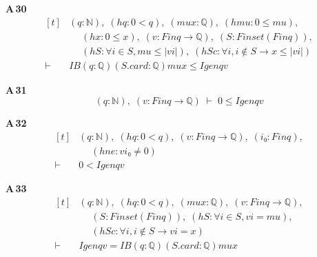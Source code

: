 \noindent\textbf{A\,30}\quad{}
{\footnotesize\[ \begin{aligned}[t]
&(\mathit{q} : \mathbb{N} ),\; (\mathit{hq} : 0 < \mathit{q}),\; (\mathit{mu} \mathit{x} : \mathbb{Q} ),\; (\mathit{hmu} : 0 \leq \mathit{mu}),\\
&\quad \; (\mathit{hx} : 0 \leq \mathit{x}),\; (\mathit{v} : \mathit{Fin} \mathit{q} \to \mathbb{Q} ),\; (\mathit{S} : \mathit{Finset} (\mathit{Fin} \mathit{q})),\\
&\quad \; (\mathit{hS} : \forall \mathit{i} \in \mathit{S}, \mathit{mu} \leq |\mathit{v} \mathit{i}|),\; (\mathit{hSc} : \forall \mathit{i}, \mathit{i} \notin \mathit{S} \to \mathit{x} \leq |\mathit{v} \mathit{i}|)\\
\vdash\;&\mathit{IB} (\mathit{q} : \mathbb{Q} ) (\mathit{S}.\mathit{card} : \mathbb{Q} ) \mathit{mu} \mathit{x} \leq \mathit{Igen} \mathit{q} \mathit{v}
\end{aligned} \]}

\noindent\textbf{A\,31}\quad{}
{\footnotesize\[ (\mathit{q} : \mathbb{N} ),\; (\mathit{v} : \mathit{Fin} \mathit{q} \to \mathbb{Q} ) \;\vdash\; 0 \leq \mathit{Igen} \mathit{q} \mathit{v} \]}

\noindent\textbf{A\,32}\quad{}
{\footnotesize\[ \begin{aligned}[t]
&(\mathit{q} : \mathbb{N} ),\; (\mathit{hq} : 0 < \mathit{q}),\; (\mathit{v} : \mathit{Fin} \mathit{q} \to \mathbb{Q} ),\; (\mathit{i₀} : \mathit{Fin} \mathit{q}),\\
&\quad \; (\mathit{hne} : \mathit{v} \mathit{i₀} \neq 0)\\
\vdash\;&0 < \mathit{Igen} \mathit{q} \mathit{v}
\end{aligned} \]}

\noindent\textbf{A\,33}\quad{}
{\footnotesize\[ \begin{aligned}[t]
&(\mathit{q} : \mathbb{N} ),\; (\mathit{hq} : 0 < \mathit{q}),\; (\mathit{mu} \mathit{x} : \mathbb{Q} ),\; (\mathit{v} : \mathit{Fin} \mathit{q} \to \mathbb{Q} ),\\
&\quad \; (\mathit{S} : \mathit{Finset} (\mathit{Fin} \mathit{q})),\; (\mathit{hS} : \forall \mathit{i} \in \mathit{S}, \mathit{v} \mathit{i} = \mathit{mu}),\\
&\quad \; (\mathit{hSc} : \forall \mathit{i}, \mathit{i} \notin \mathit{S} \to \mathit{v} \mathit{i} = \mathit{x})\\
\vdash\;&\mathit{Igen} \mathit{q} \mathit{v} = \mathit{IB} (\mathit{q} : \mathbb{Q} ) (\mathit{S}.\mathit{card} : \mathbb{Q} ) \mathit{mu} \mathit{x}
\end{aligned} \]}

